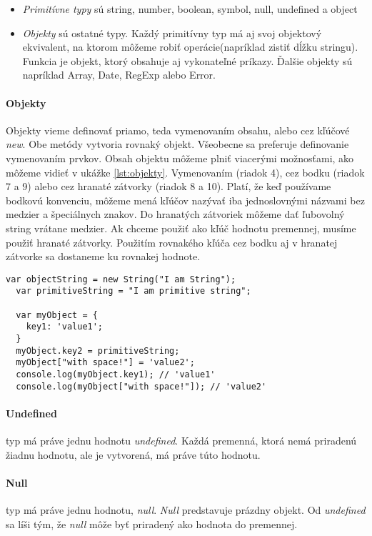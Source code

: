 \begin{itemize}
  \item \emph{Primitívne typy} sú string, number, boolean, symbol, null, undefined a object
  \item \emph{Objekty} sú ostatné typy. Každý primitívny typ má aj svoj objektový ekvivalent, na ktorom môžeme robiť operácie(napríklad zistiť dĺžku stringu). Funkcia je objekt, ktorý obsahuje aj vykonateľné príkazy. Ďalšie objekty sú napríklad Array, Date, RegExp alebo Error.
\end{itemize}

\paragraph{Objekty}
Objekty vieme definovať priamo, teda vymenovaním obsahu, alebo cez kľúčové \emph{new}. Obe metódy vytvoria rovnaký objekt. Všeobecne sa preferuje definovanie vymenovaním prvkov.
Obsah objektu môžeme plniť viacerými možnosťami, ako môžeme vidieť v ukážke \ref{lst:objekty}. Vymenovaním (riadok 4), cez bodku (riadok 7 a 9) alebo cez hranaté zátvorky (riadok 8 a 10). Platí, že keď používame bodkovú konvenciu, môžeme mená kľúčov nazývať iba jednoslovnými názvami bez medzier a špeciálnych znakov. Do hranatých zátvoriek môžeme dať ľubovolný string vrátane medzier. Ak chceme použiť ako kľúč hodnotu premennej, musíme použiť hranaté zátvorky. Použitím rovnakého kľúča cez bodku aj v hranatej zátvorke sa dostaneme ku rovnakej hodnote.

\begin{lstlisting}[caption=tvorba objektu, label={lst:objekty}]
  var objectString = new String("I am String");
  var primitiveString = "I am primitive string";

  var myObject = {
    key1: 'value1';
  }
  myObject.key2 = primitiveString;
  myObject["with space!"] = 'value2';
  console.log(myObject.key1); // 'value1'
  console.log(myObject["with space!"]); // 'value2'
\end{lstlisting}

\paragraph{Undefined} typ má práve jednu hodnotu \emph{undefined}. Každá premenná, ktorá nemá priradenú žiadnu hodnotu, ale je vytvorená, má práve túto hodnotu.

\paragraph{Null} typ má práve jednu hodnotu, \emph{null}. \emph{Null} predstavuje prázdny objekt. Od \emph{undefined} sa líši tým, že \emph{null} môže byť priradený ako hodnota do premennej.

